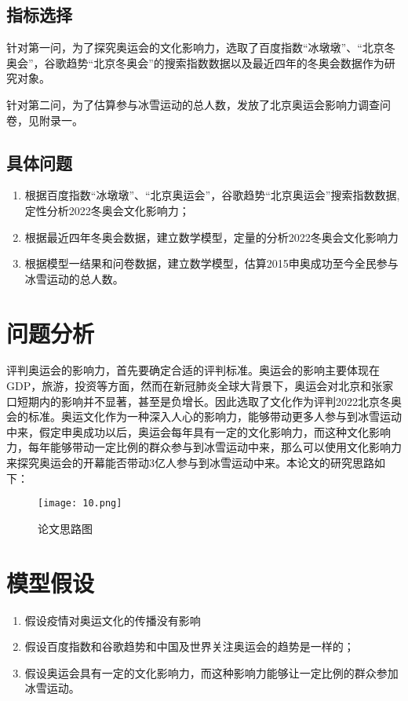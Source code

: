 \documentclass[withoutpreface,bwprint]{cumcmthesis} %
\begin{document}
\subsection{指标选择}
	针对第一问，为了探究奥运会的文化影响力，选取了百度指数“冰墩墩”、“北京冬奥会”，谷歌趋势“北京冬奥会”的搜索指数数据以及最近四年的冬奥会数据作为研究对象。
	
	针对第二问，为了估算参与冰雪运动的总人数，发放了北京奥运会影响力调查问卷，见附录一。
	
\subsection{具体问题}

\begin{enumerate}
	\item 根据百度指数“冰墩墩”、“北京奥运会”，谷歌趋势“北京奥运会”搜索指数数据,定性分析2022冬奥会文化影响力；
	\item 根据最近四年冬奥会数据，建立数学模型，定量的分析2022冬奥会文化影响力
	\item 根据模型一结果和问卷数据，建立数学模型，估算2015申奥成功至今全民参与冰雪运动的总人数。
\end{enumerate}
	
\clearpage

\section{问题分析}
   评判奥运会的影响力，首先要确定合适的评判标准。奥运会的影响主要体现在GDP，旅游，投资等方面，然而在新冠肺炎全球大背景下，奥运会对北京和张家口短期内的影响并不显著，甚至是负增长。因此选取了文化作为评判2022北京冬奥会的标准。奥运文化作为一种深入人心的影响力，能够带动更多人参与到冰雪运动中来，假定申奥成功以后，奥运会每年具有一定的文化影响力，而这种文化影响力，每年能够带动一定比例的群众参与到冰雪运动中来，那么可以使用文化影响力来探究奥运会的开幕能否带动3亿人参与到冰雪运动中来。本论文的研究思路如下：\begin{figure}[H]
   	\centering
   	\texttt{[image: 10.png]}
   	\caption{论文思路图}
   	\label{10}
   \end{figure}
   
		
\section{模型假设}
\begin{enumerate}
	\item 假设疫情对奥运文化的传播没有影响
	\item 假设百度指数和谷歌趋势和中国及世界关注奥运会的趋势是一样的；
	\item 假设奥运会具有一定的文化影响力，而这种影响力能够让一定比例的群众参加冰雪运动。
\end{enumerate}
\end{document}
